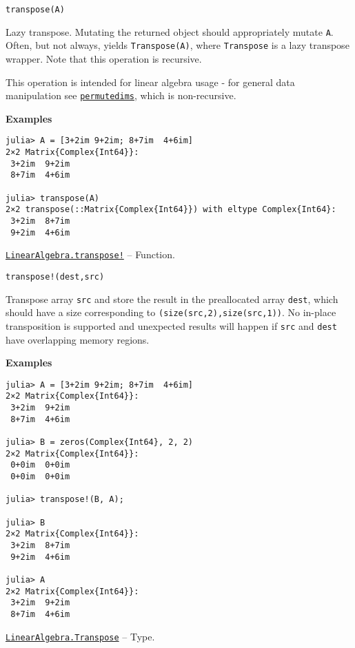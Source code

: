 \begin{adjustwidth}{2em}{0pt}


\begin{verbatim}
transpose(A)
\end{verbatim}

Lazy transpose. Mutating the returned object should appropriately mutate \texttt{A}. Often, but not always, yields \texttt{Transpose(A)}, where \texttt{Transpose} is a lazy transpose wrapper. Note that this operation is recursive.

This operation is intended for linear algebra usage - for general data manipulation see \hyperlink{10913801624539723467}{\texttt{permutedims}}, which is non-recursive.

\textbf{Examples}


\begin{verbatim}
julia> A = [3+2im 9+2im; 8+7im  4+6im]
2×2 Matrix{Complex{Int64}}:
 3+2im  9+2im
 8+7im  4+6im

julia> transpose(A)
2×2 transpose(::Matrix{Complex{Int64}}) with eltype Complex{Int64}:
 3+2im  8+7im
 9+2im  4+6im
\end{verbatim}



\end{adjustwidth}
\hypertarget{11048480146030319791}{}
\hyperlink{11048480146030319791}{\texttt{LinearAlgebra.transpose!}}  -- {Function.}

\begin{adjustwidth}{2em}{0pt}


\begin{verbatim}
transpose!(dest,src)
\end{verbatim}

Transpose array \texttt{src} and store the result in the preallocated array \texttt{dest}, which should have a size corresponding to \texttt{(size(src,2),size(src,1))}. No in-place transposition is supported and unexpected results will happen if \texttt{src} and \texttt{dest} have overlapping memory regions.

\textbf{Examples}


\begin{verbatim}
julia> A = [3+2im 9+2im; 8+7im  4+6im]
2×2 Matrix{Complex{Int64}}:
 3+2im  9+2im
 8+7im  4+6im

julia> B = zeros(Complex{Int64}, 2, 2)
2×2 Matrix{Complex{Int64}}:
 0+0im  0+0im
 0+0im  0+0im

julia> transpose!(B, A);

julia> B
2×2 Matrix{Complex{Int64}}:
 3+2im  8+7im
 9+2im  4+6im

julia> A
2×2 Matrix{Complex{Int64}}:
 3+2im  9+2im
 8+7im  4+6im
\end{verbatim}



\end{adjustwidth}
\hypertarget{14692313863932962816}{}
\hyperlink{14692313863932962816}{\texttt{LinearAlgebra.Transpose}}  -- {Type.}

